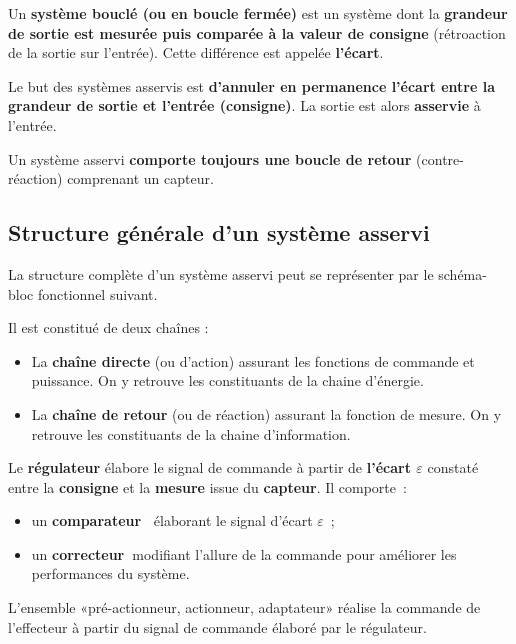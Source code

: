 Un \textbf{système bouclé (ou en boucle fermée)} est un système dont la
\textbf{grandeur de sortie est mesurée puis comparée à la valeur de
consigne} (rétroaction de la sortie sur l'entrée). Cette différence est
appelée \textbf{l'écart}.

Le but des systèmes asservis est \textbf{d'annuler en permanence l'écart
entre la grandeur de sortie et l'entrée (consigne)}. La sortie est alors
\textbf{asservie} à l'entrée.

Un système asservi \textbf{comporte toujours une boucle de retour}
(contre-réaction) comprenant un capteur.

\subsection{Structure générale d'un système
asservi}\label{structure-guxe9nuxe9rale-dun-systuxe8me-asservi}

La structure complète d'un système asservi peut se représenter par le
schéma-bloc fonctionnel suivant.

\SASchemaBoucleGenerale

Il est constitué de deux chaînes :

\begin{itemize}
\item
  La \textbf{chaîne directe} (ou d'action) assurant les fonctions de
  commande et puissance. On y retrouve les constituants de la chaine
  d'énergie.
\item
  La \textbf{chaîne de retour} (ou de réaction) assurant la fonction de
  mesure. On y retrouve les constituants de la chaine d'information.
\end{itemize}

Le \textbf{régulateur} élabore le signal de commande à partir de
\textbf{l'écart $\varepsilon$} constaté entre la \textbf{consigne} et la
\textbf{mesure} issue du \textbf{capteur}. Il comporte~:

\begin{itemize}
\item
  un \textbf{comparateur~} élaborant le signal d'écart \textbf{$\varepsilon$}~;
\item
  un \textbf{correcteur~}modifiant l'allure de la commande pour
  améliorer les performances du système.
\end{itemize}

L'ensemble «pré-actionneur, actionneur, adaptateur» réalise la commande
de l'effecteur à partir du signal de commande élaboré par le régulateur.

